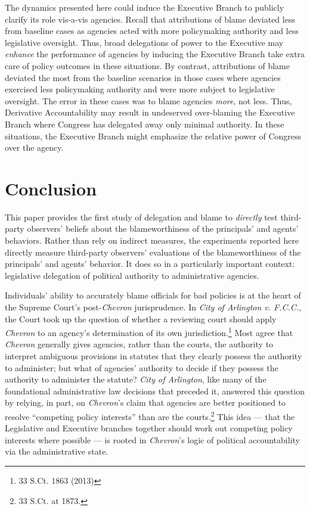 \documentclass{article}
\begin{document}
The dynamics presented here could induce the Executive Branch to publicly clarify its role vis-a-vis agencies. Recall that attributions of blame deviated less from baseline cases as agencies acted with more policymaking authority and less legislative oversight. Thus, broad delegations of power to the Executive may \emph{enhance} the performance of agencies by inducing the Executive Branch take extra care of policy outcomes in these situations. By contrast, attributions of blame deviated the most from the baseline scenarios in those cases where agencies exercised less policymaking authority and were more subject to legislative oversight. The error in these cases was to blame agencies \emph{more}, not less. Thus, Derivative Accountability may result in undeserved over-blaming the Executive Branch where Congress has delegated away only minimal authority. In these situations, the Executive Branch might emphasize the relative power of Congress over the agency. 

\section{Conclusion}

This paper provides the first study of delegation and blame to \emph{directly} test third-party observers' beliefs about the blameworthiness of the principals' and agents' behaviors. Rather than rely on indirect measures, the experiments reported here directly measure third-party observers' evaluations of the blameworthiness of the principals' and agents' behavior. It does so in a particularly important context: legislative delegation of political authority to administrative agencies. 

Individuals' ability to accurately blame officials for bad policies is at the heart of the Supreme Court's post-\emph{Chevron} jurisprudence. In \emph{City of Arlington v. F.C.C.}, the Court took up the question of whether a reviewing court should apply \emph{Chevron} to an agency's determination of its own jurisdiction.\footnote{33 S.Ct. 1863 (2013)} Most agree that \emph{Chevron} generally gives agencies, rather than the courts, the authority to interpret ambiguous provisions in statutes that they clearly possess the authority to administer; but what of agencies' authority to decide if they possess the authority to administer the statute? \emph{City of Arlington}, like many of the foundational administrative law decisions that preceded it, answered this question by relying, in part, on \emph{Chevron}'s claim that agencies are better positioned to resolve ``competing policy interests'' than are the courts.\footnote{33 S.Ct. at 1873.} This idea --- that the Legislative and Executive branches together should work out competing policy interests where possible --- is rooted in \emph{Chevron}'s logic of political accountability via the administrative state.   
\end{document}
